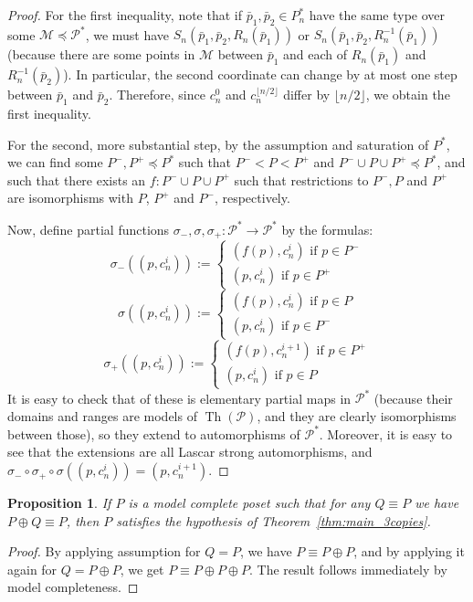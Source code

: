 \documentclass[final,a4paper,12pt]{amsart}
\DeclareMathOperator{\Th}{{Th}}
\newtheorem{prop}[thm]{Proposition}
\theoremstyle{remark}
\theoremstyle{definition}
\begin{document}
\begin{proof}
		For the first inequality, note that if $\bar p_1, \bar p_2\in P_n^*$ have the same type over some $\mathcal M\preceq \mathcal P^*$, we must have $S_n(\bar p_1,\bar p_2,R_n(\bar p_1))$ or $S_n(\bar p_1,\bar p_2,R_n^{-1}(\bar p_1))$ (because there are some points in $\mathcal M$ between $\bar p_1$ and each of $R_n(\bar p_1)$ and $R_n^{-1}(\bar p_2)$). In particular, the second coordinate can change by at most one step between $\bar p_1$ and $\bar p_2$. Therefore, since $c_n^0$ and $c_n^{\lfloor n/2\rfloor}$ differ by $\lfloor n/2\rfloor$, we obtain the first inequality.
		
		For the second, more substantial step, by the assumption and saturation of $P^*$, we can find some $P^-,P^+\preceq P^*$ such that $P^-<P<P^+$ and $P^-\cup P\cup P^+\preceq P^*$, and such that there exists an $f\colon P^-\cup P\cup P^+$ such that restrictions to $P^-,P$ and $P^+$ are isomorphisms with $P$, $P^+$ and $P^-$, respectively.
		
		Now, define partial functions $\sigma_-,\sigma,\sigma_+\colon \mathcal P^*\to \mathcal P^*$ by the formulas:
		\[
		\sigma_-((p,c_n^i)):=\begin{cases} (f(p),c_n^i)\textrm{ if }p\in P^-\\ (p,c_n^i)\textrm{ if }p\in P^+ \end{cases}
		\]
		\[
		\sigma((p,c_n^i)):=\begin{cases} (f(p),c_n^i)\textrm{ if }p\in P\\ (p,c_n^i)\textrm{ if }p\in P^- \end{cases}
		\]
		\[
		\sigma_+((p,c_n^i)):=\begin{cases} (f(p),c_n^{i+1})\textrm{ if }p\in P^+\\ (p,c_n^i)\textrm{ if }p\in P \end{cases}
		\]
		It is easy to check that of these is elementary partial maps in $\mathcal P^*$ (because their domains and ranges are models of $\Th(\mathcal P)$, and they are clearly isomorphisms between those), so they extend to automorphisms of $\mathcal P^*$. Moreover, it is easy to see that the extensions are all Lascar strong automorphisms, and $\sigma_-\circ\sigma_+\circ\sigma((p,c_n^i))=(p,c_n^{i+1})$.
	\end{proof}
	
	\begin{prop}
		If $P$ is a model complete poset such that for any $Q\equiv P$ we have $P\oplus Q\equiv P$, then $P$ satisfies the hypothesis of Theorem~\ref{thm:main_3copies}.
	\end{prop}
	\begin{proof}
		By applying assumption for $Q=P$, we have $P\equiv P\oplus P$, and by applying it again for $Q=P\oplus P$, we get $P\equiv P\oplus P\oplus P$. The result follows immediately by model completeness.
	\end{proof}
	
\end{document}
